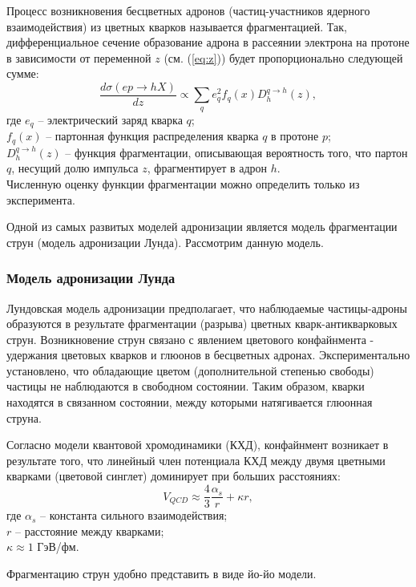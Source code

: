 \documentclass{extarticle}
\begin{document}
Процесс возникновения бесцветных адронов (частиц-участников ядерного взаимодействия) из цветных кварков называется фрагментацией. Так, дифференциальное сечение образование адрона в рассеянии электрона на протоне в зависимости от переменной $z$ (см. (\ref{eq:z})) будет пропорционально следующей сумме:
\begin{equation}
	\frac{d\sigma(ep \rightarrow hX)}{dz} \propto \sum_q e_q^2 f_q (x) D_h^{q \rightarrow h}(z),
\end{equation}
где $e_q$ -- электрический заряд кварка $q$; \\ $f_q (x)$ -- партонная функция распределения кварка $q$ в протоне $p$; \\ $D_h^{q \rightarrow h}(z)$ -- функция фрагментации, описывающая вероятность того, что партон $q$, несущий долю импульса $z$, фрагментирует в адрон $h$. \\ Численную оценку функции фрагментации можно определить только из эксперимента.

Одной из самых развитых моделей адронизации является модель фрагментации струн (модель адронизации Лунда). Рассмотрим данную модель.
\subsubsection{Модель адронизации Лунда}
Лундовская модель адронизации предполагает, что наблюдаемые частицы-адроны образуются в результате фрагментации (разрыва) цветных кварк-антикварковых струн. Возникновение струн связано с явлением цветового конфайнмента - удержания цветовых кварков и глюонов в бесцветных адронах. Экспериментально установлено, что обладающие цветом (дополнительной степенью свободы) частицы не наблюдаются в свободном состоянии.  Таким образом, кварки находятся в связанном состоянии, между которыми натягивается глюонная струна. 

Согласно модели квантовой хромодинамики (КХД), конфайнмент возникает в результате того, что линейный член потенциала КХД между двумя цветными кварками (цветовой синглет) доминирует при больших расстояниях:
\begin{equation}
	V_{QCD}\approx \frac{4}{3} \frac{\alpha_s}{r} + \kappa r,
\end{equation}
где $\alpha_s$ -- константа сильного взаимодействия; \\ $r$ -- расстояние между кварками; \\ $\kappa \approx 1$ ГэВ/фм. 


Фрагментацию струн удобно представить в виде йо-йо модели. 
\end{document}
